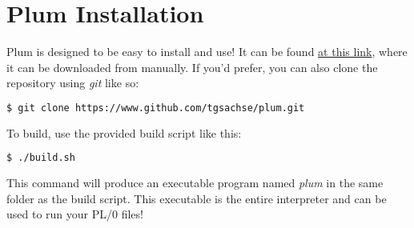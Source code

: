 \documentclass[12pt]{memoir}
\begin{document}
\section*{Plum Installation}
Plum is designed to be easy to install and use! It can be found 
\href{https://www.github.com/tgsachse/plum}{at this link}, where it can be downloaded
from manually. If you'd prefer, you can also clone the repository using \emph{git} like so:
\begin{lstlisting}[language=bash]
$ git clone https://www.github.com/tgsachse/plum.git
\end{lstlisting}
To build, use the provided build script like this:
\begin{lstlisting}[language=bash]
$ ./build.sh
\end{lstlisting}
This command will produce an executable program named \emph{plum} in the same folder as
the build script. This executable is the entire interpreter and can be used to run
your PL/0 files!

\pagebreak
\end{document}
